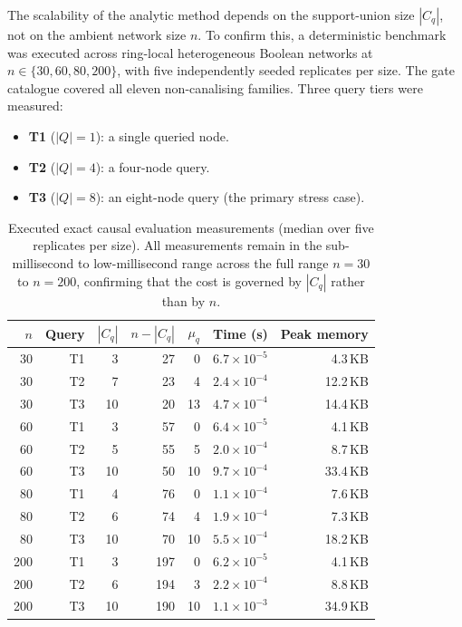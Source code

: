 \documentclass[11pt]{article}
\begin{document}
The scalability of the analytic method depends on the support-union size
$|C_q|$, not on the ambient network size $n$.  To confirm this, a
deterministic benchmark was executed across ring-local heterogeneous
Boolean networks at $n\in\{30,60,80,200\}$, with five independently
seeded replicates per size.  The gate catalogue covered all eleven
non-canalising families.  Three query tiers were measured:

\begin{itemize}
\item \textbf{T1} ($|Q|=1$): a single queried node.
\item \textbf{T2} ($|Q|=4$): a four-node query.
\item \textbf{T3} ($|Q|=8$): an eight-node query (the primary stress case).
\end{itemize}

\begin{table}[h]
\centering
\small
\begin{tabular}{rrrrrrr}
\toprule
$n$ & Query & $|C_q|$ & $n{-}|C_q|$ & $\mu_q$ & Time (s) & Peak memory \\
\midrule
 30 & T1 &  3 &  27 &  0 & $6.7\times10^{-5}$ &  4.3\,KB \\
 30 & T2 &  7 &  23 &  4 & $2.4\times10^{-4}$ & 12.2\,KB \\
 30 & T3 & 10 &  20 & 13 & $4.7\times10^{-4}$ & 14.4\,KB \\
\midrule
 60 & T1 &  3 &  57 &  0 & $6.4\times10^{-5}$ &  4.1\,KB \\
 60 & T2 &  5 &  55 &  5 & $2.0\times10^{-4}$ &  8.7\,KB \\
 60 & T3 & 10 &  50 & 10 & $9.7\times10^{-4}$ & 33.4\,KB \\
\midrule
 80 & T1 &  4 &  76 &  0 & $1.1\times10^{-4}$ &  7.6\,KB \\
 80 & T2 &  6 &  74 &  4 & $1.9\times10^{-4}$ &  7.3\,KB \\
 80 & T3 & 10 &  70 & 10 & $5.5\times10^{-4}$ & 18.2\,KB \\
\midrule
200 & T1 &  3 & 197 &  0 & $6.2\times10^{-5}$ &  4.1\,KB \\
200 & T2 &  6 & 194 &  3 & $2.2\times10^{-4}$ &  8.8\,KB \\
200 & T3 & 10 & 190 & 10 & $1.1\times10^{-3}$ & 34.9\,KB \\
\bottomrule
\end{tabular}
\caption{Executed exact causal evaluation measurements (median over five
replicates per size).  All measurements remain in the sub-millisecond to
low-millisecond range across the full range $n=30$ to $n=200$, confirming
that the cost is governed by $|C_q|$ rather than by $n$.}
\label{tab:resource-envelope}
\end{table}
\end{document}
